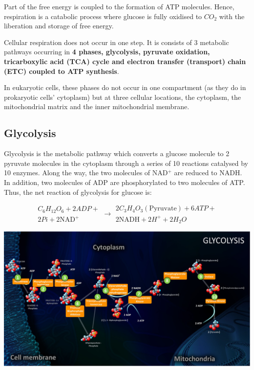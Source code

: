 \documentclass[11pt]{article}
\begin{document}
Part of the free energy is coupled to the formation of ATP molecules. Hence, respiration is a catabolic process where glucose is fully oxidised to \(CO_2\) with the liberation and storage of free energy.


Cellular respiration does not occur in one step. It is consists of 3 metabolic pathways occurring in \textbf{4 phases, glycolysis, pyruvate oxidation, tricarboxylic acid (TCA) cycle and electron transfer (transport) chain (ETC) coupled to ATP synthesis}.


In eukaryotic cells, these phases do not occur in one compartment (as they do in prokaryotic cells' cytoplasm) but at three cellular locations, the cytoplasm, the mitochondrial matrix and the inner mitochondrial membrane.

\newpage
\subsection{Glycolysis}
\label{sec:org41e7ab3}
Glycolysis is the metabolic pathway which converts a glucose molecule to 2 pyruvate molecules in the cytoplasm through a series of 10 reactions catalysed by 10 enzymes. Along the way, the two molecules of NAD\(^+\) are reduced to NADH. In addition, two molecules of ADP are phosphorylated to two molecules of ATP. Thus, the net reaction of glycolysis for glucose is:

\begin{equation*}
\begin{gathered}
C_6 H_{12} O_6 + 2ADP + \\
2Pi + 2\text{NAD}^+
\end{gathered}
\rightarrow
\begin{gathered}
2C_3H_4O_3 (\text{Pyruvate}) + 6ATP + \\
2\text{NADH} + 2H^+ + 2H_2O
\end{gathered}
\end{equation*}

\begin{center}
\includegraphics[width=.9\linewidth]{./images/glycolysis.png}
\end{center}
\end{document}
